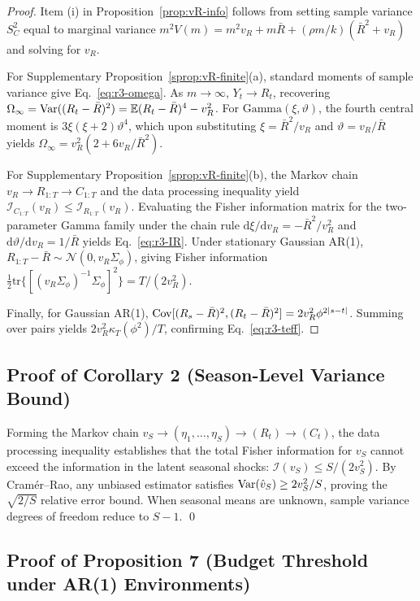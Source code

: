 \begin{proof}
Item (i) in Proposition~\ref{prop:vR-info} follows from setting sample variance $S_C^2$ equal to marginal variance $m^2 V(m) = m^2 v_R + m\bar{R} + (\rho m/k)(\bar{R}^2+v_R)$ and solving for $v_R$.

For Supplementary Proposition~\ref{sprop:vR-finite}(a), standard moments of sample variance give Eq.~\eqref{eq:r3-omega}. As $m \to \infty$, $Y_t \to R_t$, recovering $\Omega_\infty = \mathrm{Var}((R_t-\bar{R})^2) = \mathbb{E}(R_t-\bar{R})^4 - v_R^2$. For $\text{Gamma}(\xi, \vartheta)$, the fourth central moment is $3\xi(\xi+2)\vartheta^4$, which upon substituting $\xi = \bar{R}^2/v_R$ and $\vartheta = v_R/\bar{R}$ yields $\Omega_\infty = v_R^2(2 + 6v_R/\bar{R}^2)$.

For Supplementary Proposition~\ref{sprop:vR-finite}(b), the Markov chain $v_R \to R_{1:T} \to C_{1:T}$ and the data processing inequality yield $\mathcal{I}_{C_{1:T}}(v_R) \le \mathcal{I}_{R_{1:T}}(v_R)$. Evaluating the Fisher information matrix for the two-parameter Gamma family under the chain rule $\mathrm{d}\xi/\mathrm{d}v_R = -\bar{R}^2/v_R^2$ and $\mathrm{d}\vartheta/\mathrm{d}v_R = 1/\bar{R}$ yields Eq.~\eqref{eq:r3-IR}. Under stationary Gaussian AR(1), $R_{1:T} - \bar{R} \sim \mathcal{N}(0, v_R \Sigma_\phi)$, giving Fisher information $\frac{1}{2}\mathrm{tr}\{[(v_R \Sigma_\phi)^{-1}\Sigma_\phi]^2\} = T/(2v_R^2)$.

Finally, for Gaussian AR(1), $\mathrm{Cov}[(R_s-\bar{R})^2, (R_t-\bar{R})^2] = 2v_R^2 \phi^{2|s-t|}$. Summing over pairs yields $2v_R^2 \kappa_T(\phi^2)/T$, confirming Eq.~\eqref{eq:r3-teff}.
\end{proof}

\subsection{Proof of Corollary 2 (Season-Level Variance Bound)}
\label{sec:proof-cor2}

Forming the Markov chain $v_S \to (\eta_1, \dots, \eta_S) \to (R_t) \to (C_t)$, the data processing inequality establishes that the total Fisher information for $v_S$ cannot exceed the information in the latent seasonal shocks: $\mathcal{I}(v_S) \le S/(2v_S^2)$. By Cram\'er--Rao, any unbiased estimator satisfies $\mathrm{Var}(\hat{v}_S) \ge 2v_S^2/S$, proving the $\sqrt{2/S}$ relative error bound. When seasonal means are unknown, sample variance degrees of freedom reduce to $S-1$. \qed

\subsection{Proof of Proposition 7 (Budget Threshold under AR(1) Environments)}
\label{sec:proof-prop7}

